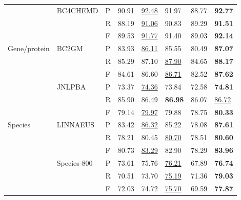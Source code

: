 \documentclass{article}
\begin{document}
\begin{table}[ht!]
{\begin{tabular}{L{2cm}L{2cm}P{1cm}P{2cm}P{2cm}P{2.5cm}P{2.5cm}P{2.5cm}}
                   & BC4CHEMD & P & 90.91 & \underline{92.48} & 91.97 & 88.77 & \textbf{92.77}\\
                   &  & R & 88.19 & \underline{91.06} & 90.83 & 89.29 & \textbf{91.51}\\
                   &  & F & 89.53 & \underline{91.77} & 91.40 & 89.03 & \textbf{92.14}\\
        
        Gene/protein & BC2GM & P & 83.93 & \underline{86.11} & 85.55 & 80.49 & \textbf{87.07}\\
                     &  & R & 85.29 & 87.10 & \underline{87.90} & 84.65 & \textbf{88.17}\\
                     &  & F & 84.61 & 86.60 & \underline{86.71} & 82.52 & \textbf{87.62}\\

                     & JNLPBA & P & 73.37 & \underline{74.36} & 73.84 & 72.58 & \textbf{74.81}\\
                     &  & R & 85.90 & 86.49 & \textbf{86.98} & 86.07 & \underline{86.72}\\
                     &  & F & 79.14 & \underline{79.97} & 79.88 & 78.75 & \textbf{80.33}\\
        
        Species      & LINNAEUS & P & 83.42 & \underline{86.32} & 85.22 & 78.08 & \textbf{87.61}\\
                     &  & R & 78.21 & 80.45 & \underline{80.70} & 78.51 & \textbf{80.60}\\
                     &  & F & 80.73 & \underline{83.29} & 82.90 & 78.29 & \textbf{83.96}\\
                     
                     & Species-800 & P & 73.61 & 75.76 & \underline{76.21} & 67.89 & \textbf{76.74}\\
                     &  & R & 70.51 & 73.70 & \underline{75.19} & 71.36 & \textbf{79.03}\\
                     &  & F & 72.03 & 74.72 & \underline{75.70} & 69.59 & \textbf{77.87}\\
                   \bottomrule
    \end{tabular}}
    \vspace{10pt}
    
\end{table}
\end{document}
